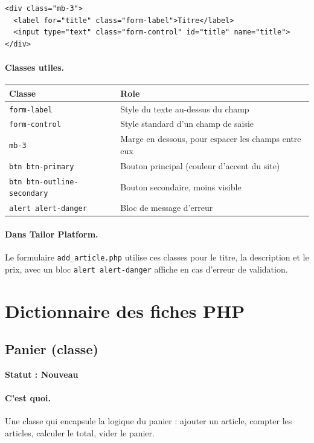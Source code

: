 \documentclass[11pt,a4paper]{article}
\newcommand{\statut}[1]{\textbf{Statut : #1}}
\begin{document}
\begin{lstlisting}
<div class="mb-3">
  <label for="title" class="form-label">Titre</label>
  <input type="text" class="form-control" id="title" name="title">
</div>
\end{lstlisting}

\paragraph{Classes utiles.}

\begin{longtable}{|p{3.5cm}|p{8.5cm}|}
\hline
\textbf{Classe} & \textbf{Role} \\
\hline
\verb|form-label| & Style du texte au-dessus du champ \\
\hline
\verb|form-control| & Style standard d'un champ de saisie \\
\hline
\verb|mb-3| & Marge en dessous, pour espacer les champs entre eux \\
\hline
\verb|btn btn-primary| & Bouton principal (couleur d'accent du site) \\
\hline
\verb|btn btn-outline-secondary| & Bouton secondaire, moins visible \\
\hline
\verb|alert alert-danger| & Bloc de message d'erreur \\
\hline
\end{longtable}

\paragraph{Dans Tailor Platform.}
Le formulaire \verb|add_article.php| utilise ces classes pour le titre, la
description et le prix, avec un bloc \verb|alert alert-danger| affiche en
cas d'erreur de validation.

\section{Dictionnaire des fiches PHP}

\subsection{Panier (classe)}

\statut{Nouveau}

\paragraph{C'est quoi.}
Une classe qui encapsule la logique du panier : ajouter un article,
compter les articles, calculer le total, vider le panier.
\end{document}
